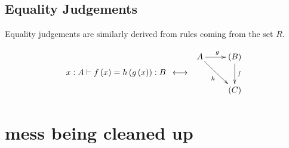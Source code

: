 \documentclass[pra,floatfix,
amsmath,superscriptaddress, 12pt]{article}
\theoremstyle{definition}
\begin{document}
\subsection{Equality Judgements}

Equality judgements are similarly derived from rules coming from the set $R$.

\[
    x:A\vdash f\left(x\right)=h\left(g\left(x\right)\right):B \, \, \,
        \longleftrightarrow \, \, \,
            \vcenter{
                \vbox{
                    \xymatrix{
                        A
                        \ar[r]^{g}
                        \ar[dr]_{h}
                            &
                            (B)
                            \ar[d]^{f}
                                \\
                            &
                                \left( C \right)}}}
\]

\section{mess being cleaned up}
\end{document}
